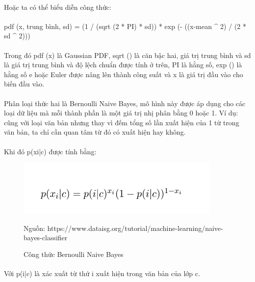 \documentclass{article}
\begin{document}
\paragraph{}Hoặc ta có thể biểu diễn công thức: 
\paragraph{}pdf (x, trung bình, sd) = (1 / (sqrt (2 * PI) * sd)) * exp (- ((x-mean ^ 2) / (2 * sd ^ 2)))
\paragraph{}Trong đó pdf (x) là Gaussian PDF, sqrt () là căn bậc hai, giá trị trung bình và sd là giá trị trung bình và độ lệch chuẩn được tính ở trên, PI là hằng số, exp () là hằng số e hoặc Euler được nâng lên thành công suất và x là giá trị đầu vào cho biến đầu vào.
\paragraph{}Phân loại thức hai là Bernoulli Naive Bayes, mô hình này được áp dụng cho các loại dữ liệu mà mỗi thành phần là một giá trị nhị phân bằng 0 hoặc 1. Ví dụ: cũng với loại văn bản nhưng thay vì đếm tổng số lần xuất hiện của 1 từ trong văn bản, ta chỉ cần quan tâm từ đó có xuất hiện hay không.
\paragraph{}Khi đó p(xi|c) được tính bằng:
\pagebreak{}
\begin{figure}[!h]
	\begin{center}
		\includegraphics[width=\linewidth]{images/Bernoulli.png}
		\caption{\fontsize{14}{20}\selectfont Công thức Bernoulli Naive Bayes}
		Nguồn: https://www.dataisg.org/tutorial/machine-learning/naive-bayes-classifier
	\end{center}
\end{figure}
\paragraph{}Với p(i|c) là xác xuất từ thứ i xuất hiện trong văn bản của lớp c.
\end{document}
